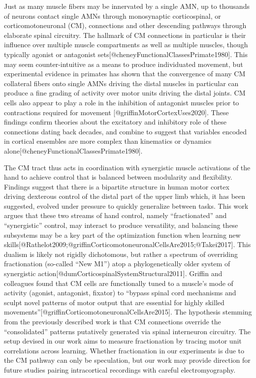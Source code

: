 \documentclass[../main.tex]{subfiles}
\begin{document}
Just as many muscle fibers may be innervated by a single AMN, up to thousands of neurons contact single AMNs through monosynaptic corticospinal, or corticomotoneuronal (CM), connections and other descending pathways through elaborate spinal circuitry. The hallmark of CM connections in particular is their influence over multiple muscle compartments as well as multiple muscles, though typically agonist or antagonist sets{[}@cheneyFunctionalClassesPrimate1980{]}. This may seem counter-intuitive as a means to produce individuated movement, but experimental evidence in primates has shown that the convergence of many CM collateral fibers onto single AMNs driving the distal muscles in particular can produce a fine grading of activity over motor units driving the distal joints. CM cells also appear to play a role in the inhibition of antagonist muscles prior to contractions required for movement {[}@griffinMotorCortexUses2020{]}. These findings confirm theories about the excitatory and inhibitory role of these connections dating back decades, and combine to suggest that variables encoded in cortical ensembles are more complex than kinematics or dynamics alone{[}@cheneyFunctionalClassesPrimate1980{]}.

The CM tract thus acts in coordination with synergistic muscle activations of the hand to achieve control that is balanced between modularity and flexibility. Findings suggest that there is a bipartite structure in human motor cortex driving dexterous control of the distal part of the upper limb which, it has been suggested, evolved under pressure to quickly generalize between tasks. This work argues that these two streams of hand control, namely ``fractionated'' and ``synergistic'' control, may interact to produce versatility, and balancing these subsystems may be a key part of the optimization function when learning new skills{[}@Rathelot2009;@griffinCorticomotoneuronalCellsAre2015;@Takei2017{]}. This dualism is likely not rigidly dichotomous, but rather a spectrum of overriding fractionation (so-called ``New M1'') atop a phylogenetically older system of synergistic action{[}@dumCorticospinalSystemStructural2011{]}. Griffin and colleagues found that CM cells are functionally tuned to a muscle's mode of activity (agonist, antagonist, fixator) to ``bypass spinal cord mechanisms and sculpt novel patterns of motor output that are essential for highly skilled movements''{[}@griffinCorticomotoneuronalCellsAre2015{]}. The hypothesis stemming from the previously described work is that CM connections override the ``consolidated'' patterns putatively generated via spinal interneuron circuitry. The setup devised in our work aims to measure fractionation by tracing motor unit correlations across learning. Whether fractionation in our experiments is due to the CM pathway can only be speculation, but our work may provide direction for future studies pairing intracortical recordings with careful electromyography.
\end{document}
